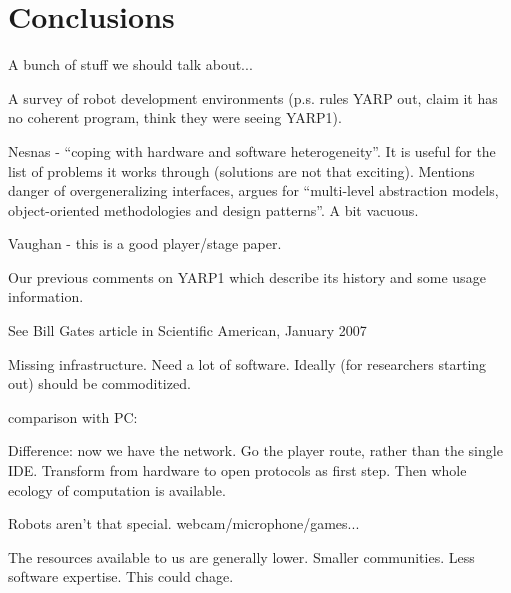 
\section{Conclusions}

A bunch of stuff we should talk about...

A survey of robot development environments
\cite{kramer2007development} (p.s. rules YARP out, claim it has
no coherent program, think they were seeing YARP1).



Nesnas \cite{nesnas2006claraty} - ``coping with hardware and software 
heterogeneity''.  It is useful for the list of problems it
works through (solutions are not that exciting).
%
Mentions danger of overgeneralizing interfaces, argues for 
``multi-level abstraction models, object-oriented methodologies
and design patterns''.  A bit vacuous.

Vaughan \cite{vaughan2006reusable} - this is a good player/stage
paper.


Our previous comments on YARP1 \cite{metta2006yarp} which
describe its history and some usage information.


See Bill Gates article in Scientific American, January 2007

Missing infrastructure.
Need a lot of software.
Ideally (for researchers starting out) should be commoditized.


comparison with PC:

Difference: now we have the network.  Go the player route, rather than
the single IDE.  Transform from hardware to open protocols as first
step.  Then whole ecology of computation is available.

Robots aren't that special.  webcam/microphone/games...

The resources available to us are generally lower.  Smaller communities.
Less software expertise.  This could chage.







